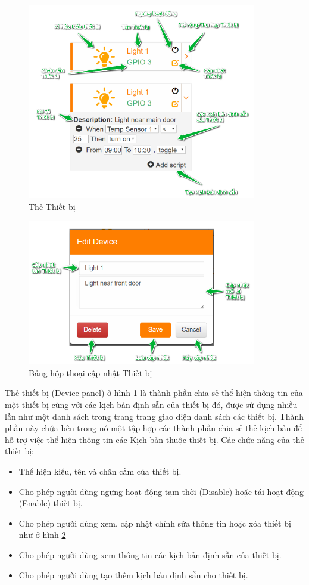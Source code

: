 \documentclass[12pt,a4paper,oneside]{extbook}
\begin{document}
\begin{figure}[h]
  \centering
     \includegraphics[width=10cm]{6-device-panel}
  \caption{Thẻ Thiết bị}\label{fig:6-device-panel}
\end{figure}

\begin{figure}[h!]
  \centering
     \includegraphics[width=10cm]{6-EditDevice}
  \caption{Bảng hộp thoại cập nhật Thiết bị}\label{fig:6-EditDevice}
\end{figure}

Thẻ thiết bị (Device-panel) ở hình \ref{fig:6-device-panel} là thành phần chia sẻ thể hiện thông tin của một thiết bị cùng với các kịch bản định sẵn của thiết bị đó, được sử dụng nhiều lần như một danh sách trong trang trang giao diện danh sách các thiết bị. Thành phần này chứa bên trong nó một tập hợp các thành phần chia sẻ thẻ kịch bản để hỗ trợ việc thể hiện thông tin các Kịch bản thuộc thiết bị. Các chức năng của thẻ thiết bị:

\begin{itemize}[topsep=1mm,itemsep=-0.5mm]
\item Thể hiện kiểu, tên và chân cắm của thiết bị.
\item Cho phép người dùng ngưng hoạt động tạm thời (Disable) hoặc tái hoạt động (Enable) thiết bị.
\item Cho phép người dùng xem, cập nhật chỉnh sửa thông tin hoặc xóa thiết bị như ở hình \ref{fig:6-EditDevice}
\item Cho phép người dùng xem thông tin các kịch bản định sẵn của thiết bị.
\item Cho phép người dùng tạo thêm kịch bản định sẵn cho thiết bị.
\vspace{1mm}
\end{itemize}
\end{document}

